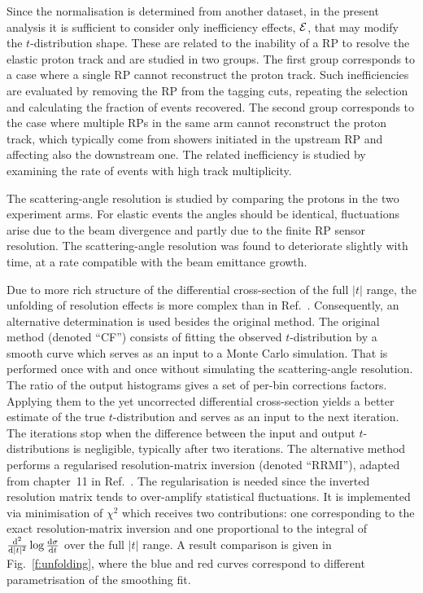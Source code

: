 \documentclass[doublecol]{epl/epl2}
\def\d{{\rm d}}
\begin{document}
Since the normalisation is determined from another dataset, in the present analysis it is sufficient to consider only inefficiency effects, ${\cal E}$, that may modify the $t$-distribution shape. These are related to the inability of a RP to resolve the elastic proton track and are studied in two groups. The first group corresponds to a case where a single RP cannot reconstruct the proton track. Such inefficiencies are evaluated by removing the RP from the tagging cuts, repeating the selection and calculating the fraction of events recovered. The second group corresponds to the case where multiple RPs in the same arm cannot reconstruct the proton track, which typically come from showers initiated in the upstream RP and affecting also the downstream one. The related inefficiency is studied by examining the rate of events with high track multiplicity.

The scattering-angle resolution is studied by comparing the protons in the two experiment arms. For elastic events the angles should be identical, fluctuations arise due to the beam divergence and partly due to the finite RP sensor resolution. The scattering-angle resolution was found to deteriorate slightly with time, at a rate compatible with the beam emittance growth.

Due to more rich structure of the differential cross-section of the full $|t|$ range, the unfolding of resolution effects is more complex than in Ref.~\cite{totem-8tev-90m}. Consequently, an alternative determination is used besides the original method. The original method (denoted ``CF'') consists of fitting the observed $t$-distribution by a smooth curve which serves as an input to a Monte Carlo simulation. That is performed once with and once without simulating the scattering-angle resolution. The ratio of the output histograms gives a set of per-bin corrections factors. Applying them to the yet uncorrected differential cross-section yields a better estimate of the true $t$-distribution and serves as an input to the next iteration. The iterations stop when the difference between the input and output $t$-distributions is negligible, typically after two iterations. The alternative method performs a regularised resolution-matrix inversion (denoted ``RRMI''), adapted from chapter~11 in Ref.~\cite{Cowan2002}. The regularisation is needed since the inverted resolution matrix tends to over-amplify statistical fluctuations. It is implemented via minimisation of $\chi^2$ which receives two contributions: one corresponding to the exact resolution-matrix inversion and one proportional to the integral of ${\d^2\over \d |t|^2} \log {\d\sigma\over \d t}$ over the full $|t|$ range. A result comparison is given in Fig.~\ref{f:unfolding}, where the blue and red curves correspond to different parametrisation of the smoothing fit.
\end{document}
